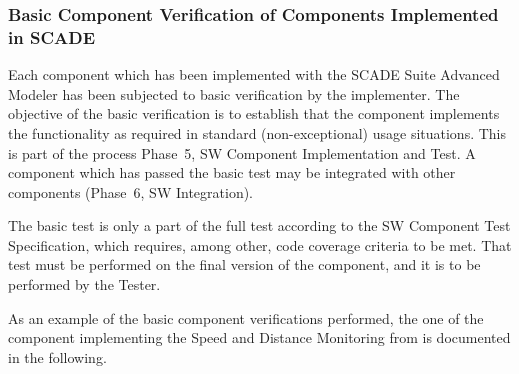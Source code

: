 
\subsubsection{Basic Component Verification of Components  Implemented in
  SCADE }
\label{sec:VnV-Code-Basic}


Each component which has been implemented with the SCADE Suite
Advanced Modeler has been subjected to basic verification by the
implementer. The objective of the basic verification is to establish
that the component implements the functionality as required in
standard (non-exceptional) usage situations. This is part of the
process Phase~5, SW Component Implementation and Test. A component
which has passed the basic test may be integrated with other
components (Phase~6, SW Integration). 

The basic test is only a part of the full test according to the SW
Component Test Specification, which requires, among other, code
coverage criteria to be met. That test must be performed on the final
version of the component, and it is to be performed by the Tester.

As an example of the basic component
verifications performed, the one of the component implementing the
Speed and Distance Monitoring from \cite[3.13]{subset-026:3.3.0} is
documented in the following.